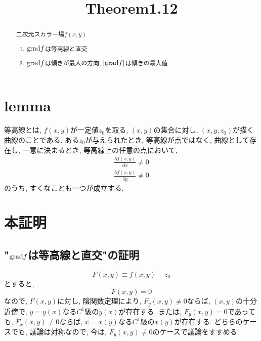 \documentclass{jsarticle}
\title{Theorem1.12}
\newcommand*{\grad}{{\rm grad}}
\begin{document}
\maketitle

\begin{abstract}
  二次元スカラー場$f(x, y)$
  \begin{enumerate}
    \item $\grad f$は等高線と直交 \label{item-1}
    \item $\grad f$は傾きが最大の方向, $|\grad f |$は傾きの最大値
  \end{enumerate}
\end{abstract}

\section*{lemma}
等高線とは, $f(x, y)$が一定値$z_0$を取る, $(x, y)$の集合に対し, $(x, y, z_0)$が描く曲線のことである. 
ある$z_0$が与えられたとき, 等高線が点ではなく, 曲線として存在し, 一意に決まるとき, 等高線上の任意の点において, 
\begin{subequations}
  \begin{eqnarray}
    \frac{\partial f(x, y)}{\partial x} \neq 0 \\
    \frac{\partial f(x, y)}{\partial y} \neq 0
  \end{eqnarray}
\end{subequations}
のうち, すくなことも一つが成立する. 

\section*{本証明}
\subsection*{"$\grad f$は等高線と直交"の証明}
\[
  F(x, y) \equiv f(x, y) - z_0
\]
とすると, 
\[
  F(x, y) = 0
\]
なので, $F(x, y)$に対し, 陰関数定理により, $F_y(x, y) \neq 0$ならば, $(x, y)$の十分近傍で, $y = y(x)$なる$C^1$級の$y(x)$が存在する. 
または, $F_y(x, y) = 0$であっても, $F_x(x, y) \neq 0$ならば, $x = x(y)$なる$C^1$級の$x(y)$が存在する. 
どちらのケースでも, 議論は対称なので, 今は, $F_y(x, y) \neq 0$のケースで議論をすすめる. 
\end{document}
